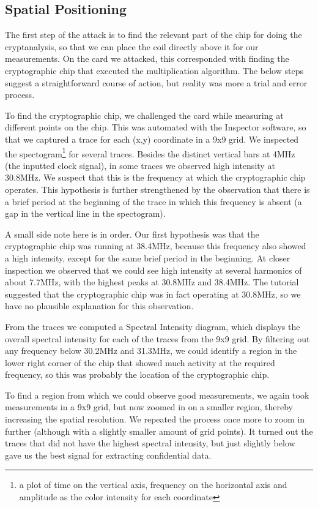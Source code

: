 \documentclass{llncs}
\begin{document}
\subsection{Spatial Positioning}

The first step of the attack is to find the relevant part of the chip for doing
the cryptanalysis, so that we can place the coil directly above it for our
measurements. On the card we attacked, this corresponded with finding the
cryptographic chip that executed the multiplication algorithm. The below steps
suggest a straightforward course of action, but reality was more a trial and
error process.

To find the cryptographic chip, we challenged the card while measuring at
different points on the chip. This was automated with the Inspector software,
so that we captured a trace for each (x,y) coordinate in a 9x9 grid. We
inspected the spectogram\footnote{a plot of time on the vertical axis,
frequency on the horizontal axis and amplitude as the color intensity for each
coordinate} for several traces. Besides the distinct vertical bars at 4MHz (the
inputted clock signal), in some traces we observed high intensity at 30.8MHz.
We suspect that this is the frequency at which the cryptographic chip operates.
This hypothesis is further strengthened by the observation that there is a
brief period at the beginning of the trace in which this frequency is absent (a
gap in the vertical line in the spectogram).

A small side note here is in order. Our first hypothesis was that the
cryptographic chip was running at 38.4MHz, because this frequency also showed a
high intensity, except for the same brief period in the beginning. At closer
inspection we observed that we could see high intensity at several harmonics of
about 7.7MHz, with the highest peaks at 30.8MHz and 38.4MHz. The tutorial
suggested that the cryptographic chip was in fact operating at 30.8MHz, so we
have no plausible explanation for this observation.

From the traces we computed a Spectral Intensity diagram, which displays the
overall spectral intensity for each of the traces from the 9x9 grid. By
filtering out any frequency below 30.2MHz and 31.3MHz, we could identify a
region in the lower right corner of the chip that showed much activity at the
required frequency, so this was probably the location of the cryptographic
chip.

To find a region from which we could observe good measurements, we again took
measurements in a 9x9 grid, but now zoomed in on a smaller region, thereby
increasing the spatial resolution. We repeated the process once more to zoom in
further (although with a slightly smaller amount of grid points). It turned out
the traces that did not have the highest spectral intensity, but just slightly
below gave us the best signal for extracting confidential data.
\end{document}
